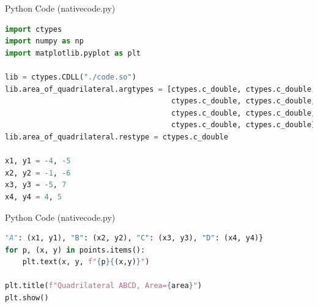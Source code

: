 \documentclass{beamer}
\begin{document}
\begin{frame}[fragile]{Python Code (nativecode.py)}
\begin{lstlisting}[language=Python]
import ctypes
import numpy as np
import matplotlib.pyplot as plt

lib = ctypes.CDLL("./code.so")
lib.area_of_quadrilateral.argtypes = [ctypes.c_double, ctypes.c_double,
                                      ctypes.c_double, ctypes.c_double,
                                      ctypes.c_double, ctypes.c_double,
                                      ctypes.c_double, ctypes.c_double]
lib.area_of_quadrilateral.restype = ctypes.c_double

x1, y1 = -4, -5
x2, y2 = -1, -6
x3, y3 = -5, 7
x4, y4 = 4, 5
\end{lstlisting}
\end{frame}
\begin{frame}[fragile]{Python Code (nativecode.py)}
\begin{lstlisting}[language=Python]
"A": (x1, y1), "B": (x2, y2), "C": (x3, y3), "D": (x4, y4)}
for p, (x, y) in points.items():
    plt.text(x, y, f"{p}{(x,y)}")

plt.title(f"Quadrilateral ABCD, Area={area}")
plt.show()
\end{lstlisting}
\end{frame}
\end{document}
